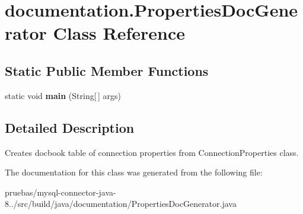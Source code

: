 \hypertarget{classdocumentation_1_1_properties_doc_generator}{}\section{documentation.\+Properties\+Doc\+Generator Class Reference}
\label{classdocumentation_1_1_properties_doc_generator}
\subsection*{Static Public Member Functions}
\begin{DoxyCompactItemize}
\item 
\mbox{\label{classdocumentation_1_1_properties_doc_generator_a7b5ce70d175861f13d3693cc66882d3b}} 
static void {\bfseries main} (String\mbox{[}$\,$\mbox{]} args)
\end{DoxyCompactItemize}


\subsection{Detailed Description}
Creates docbook table of connection properties from Connection\+Properties class. 

The documentation for this class was generated from the following file\+:\begin{DoxyCompactItemize}
\item 
pruebas/mysql-\/connector-\/java-\/8../src/build/java/documentation/Properties\+Doc\+Generator.\+java\end{DoxyCompactItemize}
